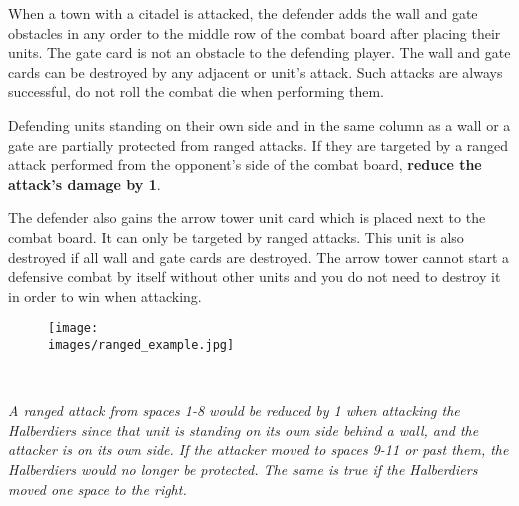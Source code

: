 When a town with a citadel is attacked, the defender adds the wall and gate obstacles in any order to the middle row of the combat board after placing their units.
The gate card is not an obstacle to the defending player.
The wall and gate cards can be destroyed by any adjacent  or  unit's attack.
Such attacks are always successful, do not roll the combat die when performing them.\par
Defending units standing on their own side and in the same column as a wall or a gate are partially protected from ranged attacks.
If they are targeted by a ranged attack performed from the opponent's side of the combat board, \textbf{reduce the attack's damage by 1}.
\par
The defender also gains the arrow tower unit card which is placed next to the combat board.
It can only be targeted by ranged attacks.
This unit is also destroyed if all wall and gate cards are destroyed.
The arrow tower cannot start a defensive combat by itself without other units and you do not need to destroy it in order to win when attacking.
\begin{figure}[h]
\centering
\texttt{[image: \\images/ranged\_example.jpg]}
\end{figure}\\
\begin{center}
\textit{A ranged attack from spaces 1-8 would be reduced by 1 when attacking the Halberdiers since that unit is standing on its own side behind a wall, and the attacker is on its own side.
If the attacker moved to spaces 9-11 or past them, the Halberdiers would no longer be protected.
The same is true if the Halberdiers moved one space to the right.}
\end{center}

\clearpage
